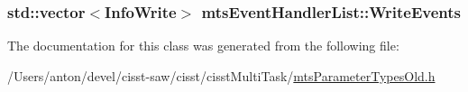 \subsubsection[{Write\+Events}]{\setlength{\rightskip}{0pt plus 5cm}std\+::vector$<${\bf Info\+Write}$>$ mts\+Event\+Handler\+List\+::\+Write\+Events}\label{classmts_event_handler_list_a81ec4eb1a15604dc9e2b0b88ff7c21a0}


The documentation for this class was generated from the following file\+:\begin{DoxyCompactItemize}
\item 
/\+Users/anton/devel/cisst-\/saw/cisst/cisst\+Multi\+Task/\hyperlink{mts_parameter_types_old_8h}{mts\+Parameter\+Types\+Old.\+h}\end{DoxyCompactItemize}

